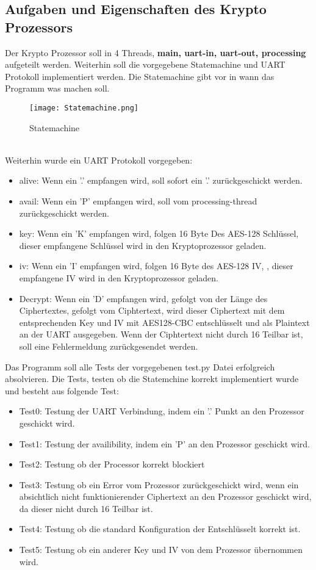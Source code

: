 \subsection{Aufgaben und Eigenschaften des Krypto Prozessors}
    Der Krypto Prozessor soll in 4 Threads, \textbf{main, uart-in, uart-out, processing} aufgeteilt werden. Weiterhin soll die vorgegebene Statemachine und UART Protokoll implementiert werden. 
    Die Statemachine gibt vor in wann das Programm was machen soll. 
    \begin{figure}[!htb]
        \centering
        \texttt{[image: Statemachine.png]}
        \caption{Statemachine}
        \label{caption:Statemachine}
    \end{figure}
    \\
    Weiterhin wurde ein UART Protokoll vorgegeben: 
    \begin{itemize}
        \setlength\itemsep{0em}
        \item alive: Wenn ein '.' empfangen wird, soll sofort ein '.' zurückgeschickt werden. 
        \item avail: Wenn ein 'P' empfangen wird, soll vom processing-thread  zurückgeschickt werden. 
        \item key: Wenn ein 'K' empfangen wird, folgen 16 Byte Des AES-128 Schlüssel, dieser empfangene Schlüssel wird in den Kryptoprozessor geladen.  
        \item iv: Wenn ein 'I' empfangen wird, folgen 16 Byte des AES-128 IV, , dieser empfangene IV wird in den Kryptoprozessor geladen.
        \item Decrypt: Wenn ein 'D' empfangen wird, gefolgt von der Länge des Ciphertextes, gefolgt vom Ciphtertext, wird dieser Ciphertext mit dem 
        entsprechenden Key und IV mit AES128-CBC entschlüsselt und als Plaintext an der UART ausgegeben. 
        Wenn der Ciphtertext nicht durch 16 Teilbar ist, soll eine Fehlermeldung  zurückgesendet werden. 
    \end{itemize}
\newpage
    \noindent Das Programm soll alle Tests der vorgegebenen test.py Datei erfolgreich absolvieren. 
    Die Tests, testen ob die Statemchine korrekt implementiert wurde und besteht aus folgende Test: 
    \begin{itemize}
        \setlength\itemsep{0em}
        \item Test0: Testung der UART Verbindung, indem ein '.' Punkt an den Prozessor geschickt wird. 
        \item Test1: Testung der availibility, indem ein 'P' an den Prozessor geschickt wird. 
        \item Test2: Testung ob der Processor korrekt blockiert 
        \item Test3: Testung ob ein Error vom Prozessor zurückgeschickt wird, wenn ein absichtlich nicht funktionierender Ciphertext an den Prozessor geschickt wird, da dieser nicht durch 16 Teilbar ist. 
        \item Test4: Testung ob die standard Konfiguration der Entschlüsselt korrekt ist. 
        \item Test5: Testung ob ein anderer Key und IV von dem Prozessor übernommen wird. 
    \end{itemize}
    

